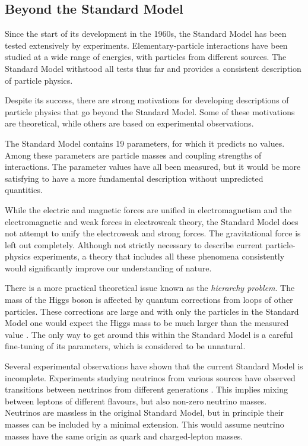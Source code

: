 \subsection{Beyond the Standard Model}
\label{subsec:intro_SM_beyond}

Since the start of its development in the 1960s, the Standard Model has been tested extensively by experiments. Elementary-particle
interactions have been studied at a wide range of energies, with particles from different sources. The Standard Model withstood all tests
thus far and provides a consistent description of particle physics.

Despite its success, there are strong motivations for developing descriptions of particle physics that go beyond the Standard Model. Some
of these motivations are theoretical, while others are based on experimental observations.

The Standard Model contains 19 parameters, for which it predicts no values. Among these parameters are particle masses and coupling
strengths of interactions. The parameter values have all been measured, but it would be more satisfying to have a more fundamental
description without unpredicted quantities.

While the electric and magnetic forces are unified in electromagnetism and the electromagnetic and weak forces in electroweak theory, the
Standard Model does not attempt to unify the electroweak and strong forces. The gravitational force is left out completely. Although not
strictly necessary to describe current particle-physics experiments, a theory that includes all these phenomena consistently would
significantly improve our understanding of nature.

There is a more practical theoretical issue known as the \emph{hierarchy problem}. The mass of the Higgs boson is affected by quantum
corrections from loops of other particles. These corrections are large and with only the particles in the Standard Model one would expect
the Higgs mass to be much larger than the measured value \cite{Weinberg:1975gm,*Susskind:1978ms,*'tHooft:1979bj}. The only way to get
around this within the Standard Model is a careful fine-tuning of its parameters, which is considered to be unnatural.

Several experimental observations have shown that the current Standard Model is incomplete. Experiments studying neutrinos from various
sources have observed transitions between neutrinos from different generations
\cite{Fukuda:1998mi,*Ahmad:2002jz,*Eguchi:2002dm,*An:2012eh}. This implies mixing between leptons of different flavours, but also non-zero
neutrino masses. Neutrinos are massless in the original Standard Model, but in principle their masses can be included by a minimal
extension. This would assume neutrino masses have the same origin as quark and charged-lepton masses.

